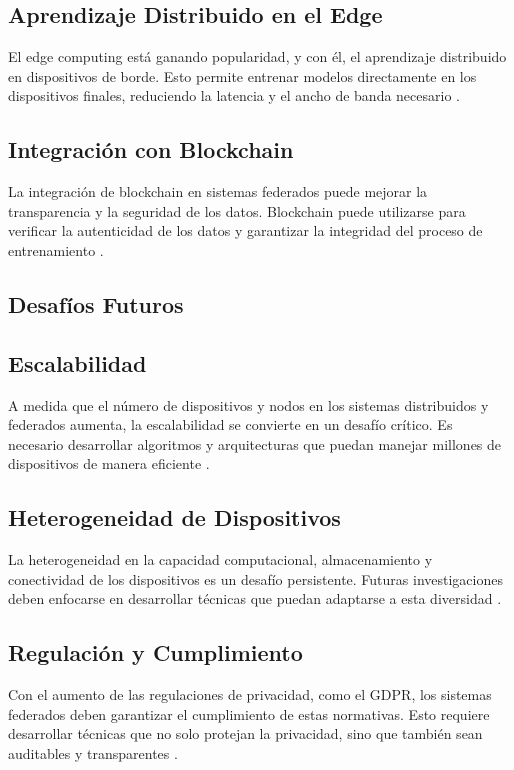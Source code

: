 \subsection{Aprendizaje Distribuido en el Edge}
El edge computing está ganando popularidad, y con él, el aprendizaje distribuido en dispositivos de borde. Esto permite entrenar modelos directamente en los dispositivos finales, reduciendo la latencia y el ancho de banda necesario \cite{shi2016edge}.

\subsection{Integración con Blockchain}
La integración de blockchain en sistemas federados puede mejorar la transparencia y la seguridad de los datos. Blockchain puede utilizarse para verificar la autenticidad de los datos y garantizar la integridad del proceso de entrenamiento \cite{li2020blockchain}.

\subsection{Desafíos Futuros}
\subsection{Escalabilidad}
A medida que el número de dispositivos y nodos en los sistemas distribuidos y federados aumenta, la escalabilidad se convierte en un desafío crítico. Es necesario desarrollar algoritmos y arquitecturas que puedan manejar millones de dispositivos de manera eficiente \cite{konevcny2016federated}.

\subsection{Heterogeneidad de Dispositivos}
La heterogeneidad en la capacidad computacional, almacenamiento y conectividad de los dispositivos es un desafío persistente. Futuras investigaciones deben enfocarse en desarrollar técnicas que puedan adaptarse a esta diversidad \cite{zhao2018federated}.

\subsection{Regulación y Cumplimiento}
Con el aumento de las regulaciones de privacidad, como el GDPR, los sistemas federados deben garantizar el cumplimiento de estas normativas. Esto requiere desarrollar técnicas que no solo protejan la privacidad, sino que también sean auditables y transparentes \cite{bonawitz2019practical}.

